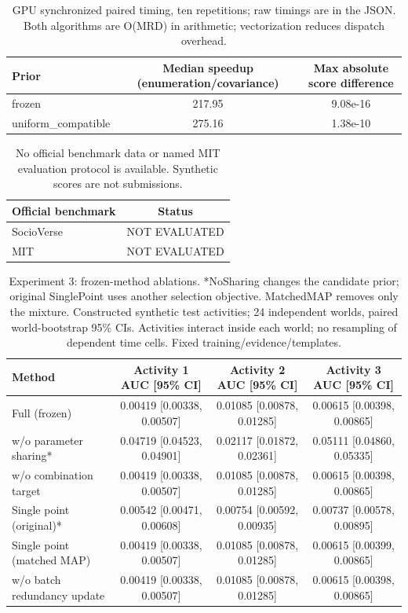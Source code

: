 \documentclass[10pt]{article}
\begin{document}
\begin{table}[t]
\centering
\small
\caption{GPU synchronized paired timing, ten repetitions; raw timings are in the JSON. Both algorithms are O(MRD) in arithmetic; vectorization reduces dispatch overhead.}
\begin{tabular}{lcc}
\toprule
Prior & Median speedup (enumeration/covariance) & Max absolute score difference \\
\midrule
frozen & 217.95 & 9.08e-16 \\
uniform\_compatible & 275.16 & 1.38e-10 \\
\bottomrule
\end{tabular}
\end{table}
\begin{table}[t]
\centering
\small
\caption{No official benchmark data or named MIT evaluation protocol is available. Synthetic scores are not submissions.}
\begin{tabular}{lc}
\toprule
Official benchmark & Status \\
\midrule
SocioVerse & NOT EVALUATED \\
MIT & NOT EVALUATED \\
\bottomrule
\end{tabular}
\end{table}

\clearpage
\begin{table}[t]
\centering
\small
\caption{Experiment 3: frozen-method ablations. *NoSharing changes the candidate prior; original SinglePoint uses another selection objective. MatchedMAP removes only the mixture. Constructed synthetic test activities; 24 independent worlds, paired world-bootstrap 95\% CIs. Activities interact inside each world; no resampling of dependent time cells. Fixed training/evidence/templates.}
\begin{tabular}{lccc}
\toprule
Method & Activity 1 AUC [95\% CI] & Activity 2 AUC [95\% CI] & Activity 3 AUC [95\% CI] \\
\midrule
Full (frozen) & 0.00419 [0.00338, 0.00507] & 0.01085 [0.00878, 0.01285] & 0.00615 [0.00398, 0.00865] \\
w/o parameter sharing* & 0.04719 [0.04523, 0.04901] & 0.02117 [0.01872, 0.02361] & 0.05111 [0.04860, 0.05335] \\
w/o combination target & 0.00419 [0.00338, 0.00507] & 0.01085 [0.00878, 0.01285] & 0.00615 [0.00398, 0.00865] \\
Single point (original)* & 0.00542 [0.00471, 0.00608] & 0.00754 [0.00592, 0.00935] & 0.00737 [0.00578, 0.00895] \\
Single point (matched MAP) & 0.00419 [0.00338, 0.00507] & 0.01085 [0.00878, 0.01285] & 0.00615 [0.00399, 0.00865] \\
w/o batch redundancy update & 0.00419 [0.00338, 0.00507] & 0.01085 [0.00878, 0.01285] & 0.00615 [0.00398, 0.00865] \\
\bottomrule
\end{tabular}
\end{table}

\clearpage
\end{document}
